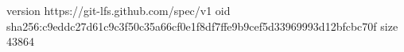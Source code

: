 version https://git-lfs.github.com/spec/v1
oid sha256:c9eddc27d61c9c3f50c35a66cf0e1f8df7ffe9b9cef5d33969993d12bfcbc70f
size 43864
